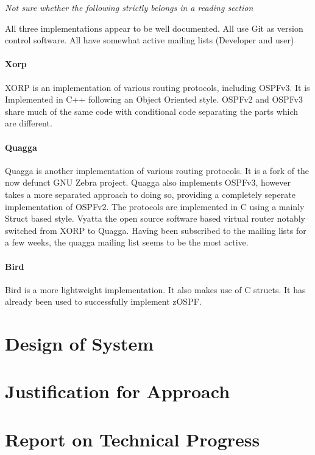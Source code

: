 \documentclass[12pt]{report}
\begin{document}
	\em Not sure whether the following strictly belongs in a reading section
	\em

	All three implementations appear to be well documented.  All use Git as
	version control software.  All have somewhat active mailing lists
	(Developer and user)

	\subsubsection{Xorp}
	XORP is an implementation of various routing protocols, including
	OSPFv3.  It is Implemented in C++ following an Object Oriented style.
	OSPFv2 and OSPFv3 share much of the same code with conditional code
	separating the parts which are different.
	
	\subsubsection{Quagga}
	Quagga is another implementation of various routing protocols.  It is a
	fork of the now defunct GNU Zebra project.  Quagga also implements
	OSPFv3, however takes a more separated approach to doing so, providing a
	completely seperate implementation of OSPFv2. 	The protocols are
	implemented in C using a mainly Struct based style.  Vyatta the open
	source software based virtual router notably switched from XORP to
	Quagga. Having been subscribed to the mailing lists for a few weeks, the
	quagga mailing list seems to be the most active.

	\subsubsection{Bird}
	Bird is a more lightweight implementation. It also makes use of C
	structs. It has already been used to successfully implement zOSPF.


\chapter{Design of System}

\chapter{Justification for Approach}

\chapter{Report on Technical Progress}
\end{document}
